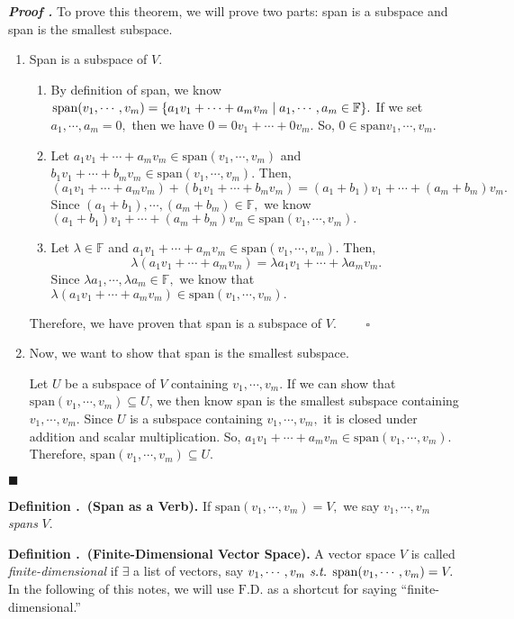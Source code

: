 \documentclass[11pt, letterpaper]{article}
\newcounter{ndf}[subsection]
\newenvironment*{df}[1]{\par\noindent\textbf{Definition \thesubsection.\stepcounter{ndf}\thendf\ (#1).}}{\par}
\newcounter{nprf}[subsection]
\newenvironment*{prf}{\par\noindent\textbf{\textit{Proof \stepcounter{nprf}\thenprf.}}}{\hfill$\blacksquare$\par}
\def\F{\mathbb{F}}
\def\st{\emph{ s.t. }}
\def\FD{\mathrm{F.D.}}
\def\span{\mathrm{span}}
\begin{document}
\begin{prf}
	To prove this theorem, we will prove two parts: span is a subspace and span is the smallest subspace. 
	\begin{enumerate}	
		\item Span is a subspace of $V$.
		\begin{enumerate}
			\item By definition of span, we know $\span(v_1,\cdots,v_m)=\qty{a_1v_1+\cdots+a_mv_m\mid a_1,\cdots,a_m\in\F}.$ If we set $a_1,\cdots,a_m=0,$ then we have $0=0v_1+\cdots+0v_m.$ So, $0\in\span{v_1,\cdots,v_m}.$
			\item Let $a_1v_1+\cdots+a_mv_m\in\span(v_1,\cdots,v_m)$ and $b_1v_1+\cdots+b_mv_m\in\span(v_1,\cdots,v_m).$ Then, \[(a_1v_1+\cdots+a_mv_m)+(b_1v_1+\cdots+b_mv_m)=(a_1+b_1)v_1+\cdots+(a_m+b_m)v_m.\] Since $(a_1+b_1),\cdots,(a_m+b_m)\in\F,$ we know $(a_1+b_1)v_1+\cdots+(a_m+b_m)v_m\in\span(v_1,\cdots,v_m).$
			\item Let $\lambda\in\F$ and $a_1v_1+\cdots+a_mv_m\in\span(v_1,\cdots,v_m)$. Then, \[\lambda(a_1v_1+\cdots+a_mv_m)=\lambda a_1v_1+\cdots+\lambda a_mv_m.\] Since $\lambda a_1,\cdots,\lambda a_m\in\F,$ we know that $\lambda(a_1v_1+\cdots+a_mv_m)\in\span(v_1,\cdots,v_m).$
		\end{enumerate}
		Therefore, we have proven that span is a subspace of $V$. $\qquad\square$
		\item Now, we want to show that span is the smallest subspace.\par Let $U$ be a subspace of $V$ containing $v_1,\cdots,v_m$. If we can  show that $\span(v_1,\cdots,v_m)\subseteq U$, we then know span is the smallest subspace containing $v_1,\cdots,v_m.$ Since $U$ is a subspace containing $v_1,\cdots,v_m,$ it is closed under addition and scalar multiplication. So, $a_1v_1+\cdots+a_mv_m\in\span(v_1,\cdots,v_m).$ Therefore, $\span(v_1,\cdots,v_m)\subseteq U.$
	\end{enumerate}	
\end{prf}
\begin{df}{Span as a Verb}
	If $\span(v_1,\cdots,v_m)=V,$ we say $v_1,\cdots,v_m$ \textit{spans} $V$.
\end{df}
\begin{df}{Finite-Dimensional Vector Space}
	A vector space $V$ is called \textit{finite-dimensional} if $\exists$ a list of vectors, say $v_1,\cdots,v_m\st\span(v_1,\cdots,v_m)=V.$ In the following of this notes, we will use $\FD$ as a shortcut for saying ``finite-dimensional.''
\end{df}
\end{document}
